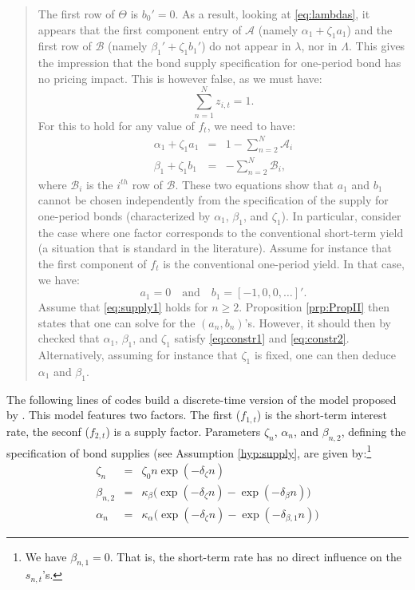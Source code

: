 \documentclass[
  12pt,
]{book}
\theoremstyle{definition}
\theoremstyle{definition}
\theoremstyle{definition}
\theoremstyle{definition}
\theoremstyle{remark}
\begin{document}
\begin{quote}
The first row of \(\Theta\) is \(b_0'=0\). As a result, looking at \eqref{eq:lambdas}, it appears that the first component entry of \(\mathcal{A}\) (namely \(\alpha_1 + \zeta_1 a_1\)) and the first row of \(\mathcal{B}\) (namely \(\beta_1' + \zeta_1 b_1'\)) do not appear in \(\lambda\), nor in \(\Lambda\). This gives the impression that the bond supply specification for one-period bond has no pricing impact. This is however false, as we must have:
\[
\sum_{n=1}^N z_{i,t} = 1.
\]
For this to hold for any value of \(f_t\), we need to have:
\begin{eqnarray}
\alpha_1 + \zeta_1 a_1 &=& 1 - \sum_{n=2}^N\mathcal{A}_i \label{eq:constr1}\\
\beta_1 + \zeta_1 b_1&=&  - \sum_{n=2}^N\mathcal{B}_i,\label{eq:constr2}
\end{eqnarray}
where \(\mathcal{B}_i\) is the \(i^{th}\) row of \(\mathcal{B}\). These two equations show that \(a_1\) and \(b_1\) cannot be chosen independently from the specification of the supply for one-period bonds (characterized by \(\alpha_1\), \(\beta_1\), and \(\zeta_1\)).
In particular, consider the case where one factor corresponds to the conventional short-term yield (a situation that is standard in the literature). Assume for instance that the first component of \(f_t\) is the conventional one-period yield. In that case, we have:
\[
a_1 = 0 \quad \mbox{and}\quad b_1 = [-1,0,0,\dots]'.
\]
Assume that \eqref{eq:supply1} holds for \(n \ge 2\). Proposition \ref{prp:PropII} then states that one can solve for the \((a_n,b_n)\)'s. However, it should then by checked that \(\alpha_1\), \(\beta_1\), and \(\zeta_1\) satisfy \eqref{eq:constr1} and \eqref{eq:constr2}. Alternatively, assuming for instance that \(\zeta_1\) is fixed, one can then deduce \(\alpha_1\) and \(\beta_1\).
\end{quote}

The following lines of codes build a discrete-time version of the model proposed by \citet{Vayanos_Vila_2021}. This model features two factors. The first (\(f_{1,t}\)) is the short-term interest rate, the seconf (\(f_{2,t}\)) is a supply factor. Parameters \(\zeta_n\), \(\alpha_n\), and \(\beta_{n,2}\), defining the specification of bond supplies (see Assumption \ref{hyp:supply}, are given by:\footnote{We have \(\beta_{n,1}=0\). That is, the short-term rate has no direct influence on the \(s_{n,t}\)'s.}
\begin{eqnarray}
\zeta_n &=& \zeta_0 n \exp(-\delta_\zeta n) \\
\beta_{n,2} &=& \kappa_{\beta} \big( \exp(-\delta_\zeta n) - \exp(-\delta_{\beta} n) \big) \\
\alpha_n &=& \kappa_\alpha \big( \exp(-\delta_\zeta n) - \exp(-\delta_{\beta,1} n) \big) \end{eqnarray}
\end{document}
